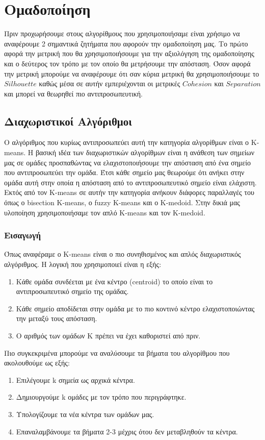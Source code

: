 \chapter{Ομαδοποίηση}
Πριν προχωρήσουμε στους αλγορίθμους που χρησιμοποιήσαμε είναι χρήσιμο να αναφέρουμε 2 σημαντικά ζητήματα που αφορούν την ομαδοποίηση μας. Το πρώτο αφορά την μετρική που θα χρησιμοποιήσουμε για την αξιολόγηση της ομαδοποίησης και ο δεύτερος τον τρόπο με τον οποίο θα μετρήσουμε την απόσταση. Όσον αφορά την μετρική μπορούμε να αναφέρουμε ότι σαν κύρια μετρική θα χρησιμοποιήσουμε το $Silhouette$ καθώς μέσα σε αυτήν εμπεριέχονται οι μετρικές $Cohesion$ και $Separation$ και μπορεί να θεωρηθεί πιο αντιπροσωπευτική.
\section{Διαχωριστικοί Αλγόριθμοι}
Ο αλγόριθμος που κυρίως αντιπροσωπεύει αυτή την κατηγορία αλγορίθμων είναι ο K-means. Η βασική ιδέα των διαχωριστικών αλγορίθμων είναι η ανάθεση των σημείων μας σε ομάδες προσπαθώντας να ελαχιστοποιήσουμε την απόσταση από ένα σημείο που αντιπροσωπεύει την ομάδα. Έτσι κάθε σημείο μας θεωρούμε ότι ανήκει στην ομάδα αυτή στην οποία η απόσταση από το αντιπροσωπευτικό σημείο είναι ελάχιστη. Εκτός από τον K-means σε αυτήν την κατηγορία ανήκουν διάφορες παραλλαγές του όπως ο bisection K-means, ο fuzzy Κ-means και ο K-medoid. Στην δικιά μας υλοποίηση χρησιμοποιήσαμε τον απλό K-means και τον K-medoid.

\subsection{Εισαγωγή}
Όπως αναφέραμε ο K-means είναι ο πιο συνηθισμένος και απλός διαχωριστικός αλγόριθμος. Η λογική που χρησιμοποιεί είναι η εξής:
\begin{enumerate}
    \item Κάθε ομάδα συνδέεται με ένα κέντρο (centroid) το οποίο είναι το αντιπροσωπευτικό σημείο της ομάδας.
    \item Κάθε σημείο αποδίδεται στην ομάδα με το πιο κοντινό κέντρο ελαχιστοποιώντας την μεταξύ τους απόσταση.
    \item Ο αριθμός των ομάδων Κ πρέπει να έχει καθοριστεί από πριν.
\end{enumerate}

Πιο συγκεκριμένα μπορούμε να αναλύσουμε τα βήματα του αλγορίθμου που ακολουθούμε ως εξής:
\begin{enumerate}
    \item Επιλέγουμε k σημεία ως αρχικά κέντρα.
    \item Δημιουργούμε k ομάδες με τον τρόπο που περιγράφτηκε.
    \item Υπολογίζουμε τα νέα κέντρα των ομάδων μας.
    \item Επαναλαμβάνουμε τα βήματα 2-3 μέχρις ότου δεν μεταβληθούν τα κέντρα.
\end{enumerate}

